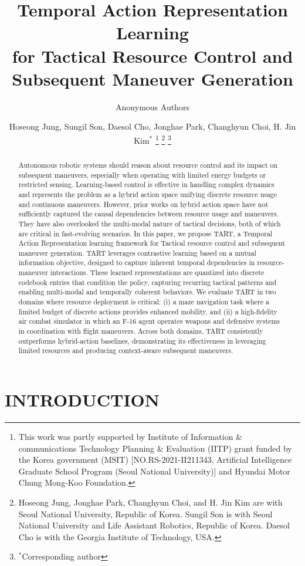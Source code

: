 \documentclass[letterpaper, 10 pt, conference]{ieeeconf}
\title{\LARGE \bf Temporal Action Representation Learning 
\\for Tactical Resource Control and Subsequent Maneuver Generation}
\author{Anonymous Authors}
\author{Hoseong Jung, Sungil Son, Daesol Cho, Jonghae Park, Changhyun Choi, H. Jin Kim$^{*}$
\thanks{This work was partly supported by Institute of Information \& communications Technology Planning \& Evaluation (IITP) grant funded by the Korea government (MSIT) [NO.RS-2021-II211343, Artificial Intelligence Graduate School Program (Seoul National University)] and Hyundai Motor Chung Mong-Koo Foundation.}
\thanks{Hoseong Jung, Jonghae Park, Changhyun Choi, and H. Jin Kim are with Seoul National University, Republic of Korea.
Sungil Son is with Seoul National University and Life Assistant Robotics, Republic of Korea.
Daesol Cho is with the Georgia Institute of Technology, USA.}
\thanks{$^*$Corresponding author}}%
\begin{document}
\maketitle


\begin{abstract}
Autonomous robotic systems should reason about resource control and its impact on subsequent maneuvers, especially when operating with limited energy budgets or restricted sensing.
Learning-based control is effective in handling complex dynamics and represents the problem as a hybrid action space unifying discrete resource usage and continuous maneuvers.
However, prior works on hybrid action space have not sufficiently captured the causal dependencies between resource usage and maneuvers.
They have also overlooked the multi-modal nature of tactical decisions, both of which are critical in fast-evolving scenarios.
In this paper, we propose TART, a Temporal Action Representation learning framework for Tactical resource control and subsequent maneuver generation.
TART leverages contrastive learning based on a mutual information objective, designed to capture inherent temporal dependencies in resource-maneuver interactions.
These learned representations are quantized into discrete codebook entries that condition the policy, capturing recurring tactical patterns and enabling multi-modal and temporally coherent behaviors.
We evaluate TART in two domains where resource deployment is critical: (i) a maze navigation task where a limited budget of discrete actions provides enhanced mobility, and (ii) a high-fidelity air combat simulator in which an F-16 agent operates weapons and defensive systems in coordination with flight maneuvers.
Across both domains, TART consistently outperforms hybrid-action baselines, demonstrating its effectiveness in leveraging limited resources and producing context-aware subsequent maneuvers.
\end{abstract}

\section{INTRODUCTION}


\end{document}
